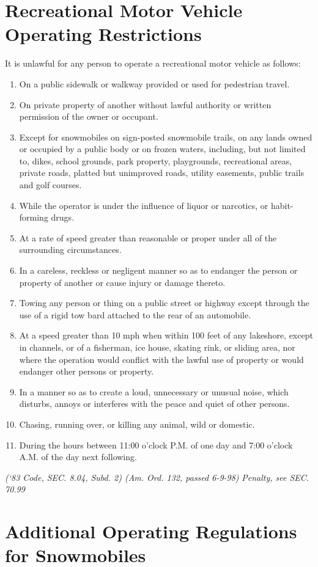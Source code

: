 \documentclass[code.tex]{subfiles}
\begin{document}
\section{Recreational Motor Vehicle Operating Restrictions}
It is unlawful for any person to operate a recreational motor vehicle as follows:
\begin{enumerate}[{\indent}A)]
\item On a public sidewalk or walkway provided or used for pedestrian travel.
\item On private property of another without lawful authority or written permission of the owner or occupant.
\item Except for snowmobiles on sign‑posted snowmobile trails, on any lands owned or occupied by a public body or on frozen waters, including, but not limited to, dikes, school grounds, park property, playgrounds, recreational areas, private roads, platted but unimproved roads, utility easements, public trails and golf courses.
\item While the operator is under the influence of liquor or narcotics, or habit-forming drugs.
\item At a rate of speed greater than reasonable or proper under all of the surrounding circumstances.
\item In a careless, reckless or negligent manner so as to endanger the person or property of another or cause injury or damage thereto.
\item Towing any person or thing on a public street or highway except through the use of a rigid tow bard attached to the rear of an automobile.
\item At a speed greater than 10 mph when within 100 feet of any lakeshore, except in channels, or of a fisherman, ice house, skating rink, or sliding area, nor where the operation would conflict with the lawful use of property or would endanger other persons or property.
\item In a manner so as to create a loud, unnecessary or unusual noise, which disturbs, annoys or interferes with the peace and quiet of other persons.
\item Chasing, running over, or killing any animal, wild or domestic.
\item During the hours between 11:00 o'clock P.M. of one day and 7:00 o'clock A.M. of the day next following.
\end{enumerate}
\emph{(‘83 Code, SEC. 8.04, Subd. 2) (Am. Ord. 132, passed 6-9-98)}
\emph{Penalty, see SEC. 70.99}
\section{Additional Operating Regulations for Snowmobiles}
\end{document}
